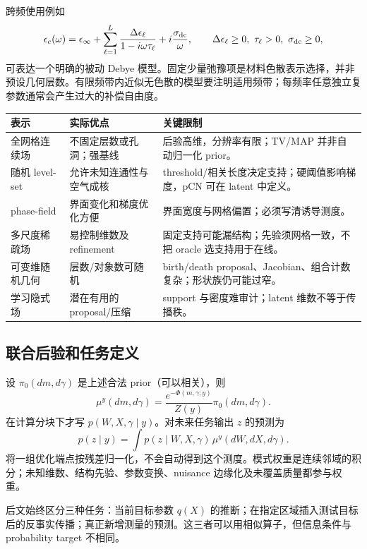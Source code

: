 跨频使用例如
\[
\epsilon_c(\omega)=\epsilon_\infty+
\sum_{\ell=1}^L\frac{\Delta\epsilon_\ell}{1-i\omega\tau_\ell}
+i\frac{\sigma_{\rm dc}}{\omega},\qquad
\Delta\epsilon_\ell\ge0,\ \tau_\ell>0,\ \sigma_{\rm dc}\ge0,
\]
可表达一个明确的被动 Debye 模型。固定少量弛豫项是材料色散表示选择，并非预设几何层数。有限频带内近似无色散的模型要注明适用频带；每频率任意独立复参数通常会产生过大的补偿自由度。

\begin{longtable}{p{28mm}p{43mm}p{77mm}}
\toprule
表示 & 实际优点 & 关键限制\\
\midrule
全网格连续场 & 不固定层数或孔洞；强基线 & 后验高维，分辨率有限；TV/MAP 并非自动归一化 prior。\\
随机 level-set & 允许未知连通性与空气成核 & threshold/相关长度决定支持；硬阈值影响梯度，pCN 可在 latent 中定义。\\
phase-field & 界面变化和梯度优化方便 & 界面宽度与网格偏置；必须写清诱导测度。\\
多尺度稀疏场 & 易控制维数及 refinement & 固定支持可能漏结构；先验须网格一致，不把 oracle 选支持用于在线。\\
可变维随机几何 & 层数/对象数可随机 & birth/death proposal、Jacobian、组合计数复杂；形状族仍可能过窄。\\
学习隐式场 & 潜在有用的 proposal/压缩 & support 与密度难审计；latent 维数不等于传播秩。\\
\bottomrule
\end{longtable}

\subsection{联合后验和任务定义}
设 $\pi_0(dm,d\gamma)$ 是上述合法 prior（可以相关），则
\[
\mu^y(dm,d\gamma)
=\frac{e^{-\Phi(m,\gamma;y)}}{Z(y)}\pi_0(dm,d\gamma).
\]
在计算分块下才写 $p(W,X,\gamma\mid y)$。对未来任务输出 $z$ 的预测为
\[
p(z\mid y)=\int p(z\mid W,X,\gamma)\,\mu^y(dW,dX,d\gamma).
\]
将一组优化端点按残差归一化，不会自动得到这个测度。模式权重是连续邻域的积分；未知维数、结构先验、参数变换、nuisance 边缘化及未覆盖质量都参与权重。

后文始终区分三种任务：当前目标参数 $q(X)$ 的推断；在指定区域插入测试目标后的反事实传播；真正新增测量的预测。这三者可以用相似算子，但信息条件与 probability target 不相同。

